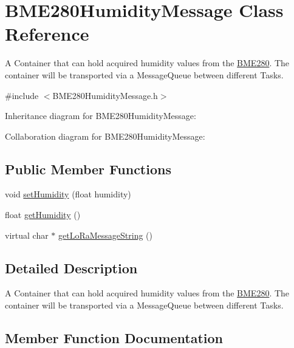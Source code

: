 \hypertarget{class_b_m_e280_humidity_message}{}\section{B\+M\+E280\+Humidity\+Message Class Reference}
\label{class_b_m_e280_humidity_message}


A Container that can hold acquired humidity values from the \hyperlink{class_b_m_e280}{B\+M\+E280}. The container will be transported via a Message\+Queue between different Tasks.  




{\ttfamily \#include $<$B\+M\+E280\+Humidity\+Message.\+h$>$}



Inheritance diagram for B\+M\+E280\+Humidity\+Message\+:


Collaboration diagram for B\+M\+E280\+Humidity\+Message\+:
\subsection*{Public Member Functions}
\begin{DoxyCompactItemize}
\item 
void \hyperlink{class_b_m_e280_humidity_message_a3513519af9d97399981b4f1a5a8f987a}{set\+Humidity} (float humidity)
\item 
float \hyperlink{class_b_m_e280_humidity_message_a3acc6140309a09385c77a0f5a0b86b20}{get\+Humidity} ()
\item 
virtual char $\ast$ \hyperlink{class_b_m_e280_humidity_message_acdee6e41c92c624cfd9dde11a7781e5d}{get\+Lo\+Ra\+Message\+String} ()
\end{DoxyCompactItemize}


\subsection{Detailed Description}
A Container that can hold acquired humidity values from the \hyperlink{class_b_m_e280}{B\+M\+E280}. The container will be transported via a Message\+Queue between different Tasks. 

\subsection{Member Function Documentation}
\hypertarget{class_b_m_e280_humidity_message_a3acc6140309a09385c77a0f5a0b86b20}{}
